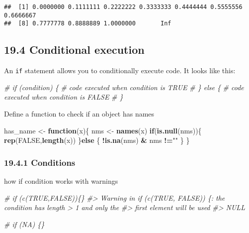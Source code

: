 \documentclass[
]{article}
\newenvironment{Shaded}{\begin{snugshade}}{\end{snugshade}}
\newcommand{\CommentTok}[1]{\textcolor[rgb]{0.56,0.35,0.01}{\textit{#1}}}
\newcommand{\ConstantTok}[1]{\textcolor[rgb]{0.56,0.35,0.01}{#1}}
\newcommand{\ControlFlowTok}[1]{\textcolor[rgb]{0.13,0.29,0.53}{\textbf{#1}}}
\newcommand{\FunctionTok}[1]{\textcolor[rgb]{0.13,0.29,0.53}{\textbf{#1}}}
\newcommand{\NormalTok}[1]{#1}
\newcommand{\OtherTok}[1]{\textcolor[rgb]{0.56,0.35,0.01}{#1}}
\newcommand{\SpecialCharTok}[1]{\textcolor[rgb]{0.81,0.36,0.00}{\textbf{#1}}}
\newcommand{\StringTok}[1]{\textcolor[rgb]{0.31,0.60,0.02}{#1}}
\begin{document}
\begin{verbatim}
##  [1] 0.0000000 0.1111111 0.2222222 0.3333333 0.4444444 0.5555556 0.6666667
##  [8] 0.7777778 0.8888889 1.0000000       Inf
\end{verbatim}

\hypertarget{conditional-execution}{%
\subsection{19.4 Conditional execution}\label{conditional-execution}}

An \texttt{if} statement allows you to conditionally execute code. It
looks like this:

\begin{Shaded}
\begin{Highlighting}[]
\CommentTok{\# if (condition) \{}
  \CommentTok{\# code executed when condition is TRUE}
\CommentTok{\# \} else \{}
  \CommentTok{\# code executed when condition is FALSE}
\CommentTok{\# \}}
\end{Highlighting}
\end{Shaded}

Define a function to check if an object has names

\begin{Shaded}
\begin{Highlighting}[]
\NormalTok{has\_name }\OtherTok{\textless{}{-}} \ControlFlowTok{function}\NormalTok{(x)\{}
\NormalTok{  nms }\OtherTok{\textless{}{-}} \FunctionTok{names}\NormalTok{(x)}
  \ControlFlowTok{if}\NormalTok{(}\FunctionTok{is.null}\NormalTok{(nms))\{}
    \FunctionTok{rep}\NormalTok{(}\ConstantTok{FALSE}\NormalTok{,}\FunctionTok{length}\NormalTok{(x))}
\NormalTok{  \}}\ControlFlowTok{else}\NormalTok{ \{}
    \SpecialCharTok{!}\FunctionTok{is.na}\NormalTok{(nms) }\SpecialCharTok{\&}\NormalTok{ nms }\SpecialCharTok{!=}\StringTok{""}
\NormalTok{  \}}
\NormalTok{\}}
\end{Highlighting}
\end{Shaded}

\hypertarget{conditions}{%
\subsubsection{19.4.1 Conditions}\label{conditions}}

how if condition works with warnings

\begin{Shaded}
\begin{Highlighting}[]
\CommentTok{\# if (c(TRUE,FALSE))\{\}}
\CommentTok{\#\textgreater{} Warning in if (c(TRUE, FALSE)) \{: the condition has length \textgreater{} 1 and only the}
\CommentTok{\#\textgreater{} first element will be used}
\CommentTok{\#\textgreater{} NULL}

\CommentTok{\# if (NA) \{\}}
\end{Highlighting}
\end{Shaded}
\end{document}
